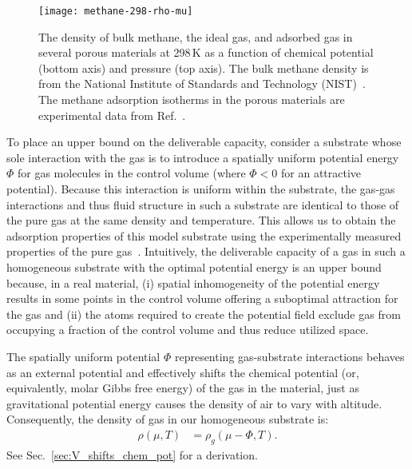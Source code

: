 \documentclass[twoside,twocolumn,9pt]{article}
\newcommand\V{\Phi}
\begin{document}
\begin{figure}
    \centering
    \texttt{[image: methane-298-rho-mu]}
    \caption{The density of bulk methane, the ideal gas, and adsorbed gas in several porous materials at 298\,K as a function of chemical potential (bottom axis) and pressure (top axis). The bulk methane density is from the National Institute of Standards and Technology (NIST)~\cite{nist}. The methane adsorption isotherms in the porous materials are experimental data from Ref.~\cite{mason2014evaluating, furukawa2009storage, tian2018sol, gandara2014high, zhang2017fine}.
    }
    \label{fig:density-vs-mu-ch4}
  \end{figure}
  
To place an upper bound on the deliverable capacity, consider a substrate whose
sole interaction with the gas is to introduce a spatially uniform potential
energy $\V$ for gas molecules in the control volume (where $\V<0$ for an
attractive potential). Because this interaction is uniform within the
substrate, the gas-gas interactions and thus fluid structure in such a
substrate are identical to those of the pure gas at the same density and
temperature. This allows us to obtain the adsorption properties of this model
substrate using the experimentally measured properties of the pure
gas~\cite{nist}. Intuitively, the deliverable capacity of a gas in such a
homogeneous substrate with the optimal potential energy is an upper bound
because, in a real material, (i) spatial inhomogeneity of the potential
energy results in some points in the control volume offering a suboptimal
attraction for the gas and (ii) the atoms required to create the potential
field exclude gas from occupying a fraction of the control volume and thus reduce utilized space.

The spatially uniform potential $\V$ representing gas-substrate interactions
behaves as an external potential and effectively shifts the chemical potential
(or, equivalently, molar Gibbs free energy) of the gas in the material, just as
gravitational potential energy causes the density of air to vary with altitude.
Consequently, the density of gas in our homogeneous substrate is:
\begin{align}
    \rho(\mu,T) &= \rho_g(\mu - \V,T). \label{eq:mof-density}
\end{align}
See Sec.~\ref{sec:V_shifts_chem_pot} for a derivation.
\end{document}

